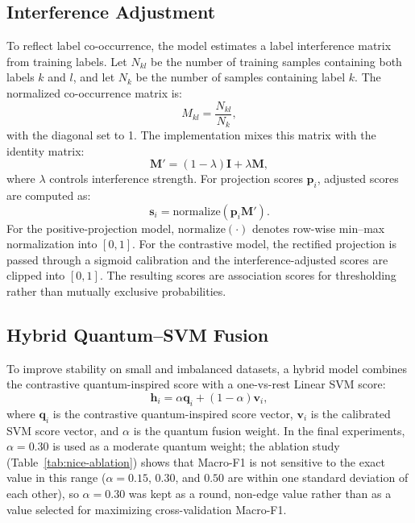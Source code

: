 \documentclass[runningheads]{llncs}
\begin{document}
\subsection{Interference Adjustment}
To reflect label co-occurrence, the model estimates a label interference matrix
from training labels. Let $N_{kl}$ be the number of training samples containing
both labels $k$ and $l$, and let $N_k$ be the number of samples containing label
$k$. The normalized co-occurrence matrix is:
\begin{equation}
    M_{kl} = \frac{N_{kl}}{N_k},
\end{equation}
with the diagonal set to 1. The implementation mixes this matrix with the
identity matrix:
\begin{equation}
    \mathbf{M}' = (1-\lambda)\mathbf{I} + \lambda\mathbf{M},
\end{equation}
where $\lambda$ controls interference strength. For projection scores
$\mathbf{p}_i$, adjusted scores are computed as:
\begin{equation}
    \mathbf{s}_i = \mathrm{normalize}(\mathbf{p}_i \mathbf{M}').
\end{equation}
For the positive-projection model, $\mathrm{normalize}(\cdot)$ denotes row-wise
min--max normalization into $[0,1]$. For the contrastive model, the rectified
projection is passed through a sigmoid calibration and the interference-adjusted
scores are clipped into $[0,1]$. The resulting scores are association scores
for thresholding rather than mutually exclusive probabilities.

\subsection{Hybrid Quantum--SVM Fusion}
To improve stability on small and imbalanced datasets, a hybrid model combines
the contrastive quantum-inspired score with a one-vs-rest Linear SVM score:
\begin{equation}
    \mathbf{h}_i = \alpha \mathbf{q}_i + (1-\alpha)\mathbf{v}_i,
\end{equation}
where $\mathbf{q}_i$ is the contrastive quantum-inspired score vector,
$\mathbf{v}_i$ is the calibrated SVM score vector, and $\alpha$ is the quantum
fusion weight. In the final experiments, $\alpha=0.30$ is used as a moderate
quantum weight; the ablation study (Table~\ref{tab:nice-ablation}) shows that
Macro-F1 is not sensitive to the exact value in this range ($\alpha=0.15$,
$0.30$, and $0.50$ are within one standard deviation of each other), so
$\alpha=0.30$ was kept as a round, non-edge value rather than as a value
selected for maximizing cross-validation Macro-F1.
\end{document}
